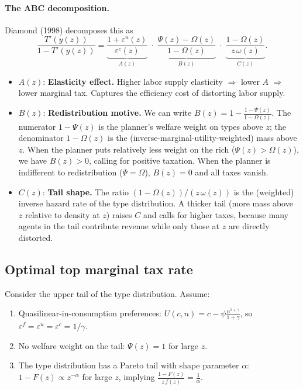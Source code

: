 \documentclass[12pt,a4paper]{article}
\theoremstyle{definition}
\theoremstyle{plain}
\theoremstyle{remark}
\begin{document}
\paragraph{The ABC decomposition.} Diamond (1998) decomposes this as
\begin{equation}
\label{eq:ABC}
  \frac{T'(y(z))}{1 - T'(y(z))} =
  \underbrace{\frac{1+\varepsilon^u(z)}{\varepsilon^c(z)}}_{A(z)}
  \;\cdot\;
  \underbrace{\frac{\Psi(z) - \Omega(z)}{1 - \Omega(z)}}_{B(z)}
  \;\cdot\;
  \underbrace{\frac{1 - \Omega(z)}{z \, \omega(z)}}_{C(z)}.
\end{equation}
\begin{itemize}[leftmargin=2em]
  \item $A(z)$: \textbf{Elasticity effect.} Higher labor supply elasticity $\Rightarrow$ lower $A$ $\Rightarrow$ lower marginal tax. Captures the efficiency cost of distorting labor supply.

  \item $B(z)$: \textbf{Redistribution motive.} We can write $B(z) = 1 - \frac{1 - \Psi(z)}{1 - \Omega(z)}$. The numerator $1 - \Psi(z)$ is the planner's welfare weight on types above $z$; the denominator $1 - \Omega(z)$ is the (inverse-marginal-utility-weighted) mass above $z$. When the planner puts relatively less weight on the rich ($\Psi(z) > \Omega(z)$), we have $B(z) > 0$, calling for positive taxation. When the planner is indifferent to redistribution ($\Psi = \Omega$), $B(z) = 0$ and all taxes vanish.

  \item $C(z)$: \textbf{Tail shape.} The ratio $(1 - \Omega(z))/(z \, \omega(z))$ is the (weighted) inverse hazard rate of the type distribution. A thicker tail (more mass above $z$ relative to density at $z$) raises $C$ and calls for higher taxes, because many agents in the tail contribute revenue while only those at $z$ are directly distorted.
\end{itemize}

\subsection{Optimal top marginal tax rate}

Consider the upper tail of the type distribution. Assume:
\begin{enumerate}[label=(\alph*)]
  \item Quasilinear-in-consumption preferences: $U(c,n) = c - \psi \frac{n^{1+\gamma}}{1+\gamma}$, so $\varepsilon^f = \varepsilon^u = \varepsilon^c = 1/\gamma$.
  \item No welfare weight on the tail: $\Psi(z) = 1$ for large $z$.
  \item The type distribution has a Pareto tail with shape parameter $\alpha$: $1 - F(z) \propto z^{-\alpha}$ for large $z$, implying $\frac{1-F(z)}{z \, f(z)} = \frac{1}{\alpha}$.
\end{enumerate}
\end{document}

